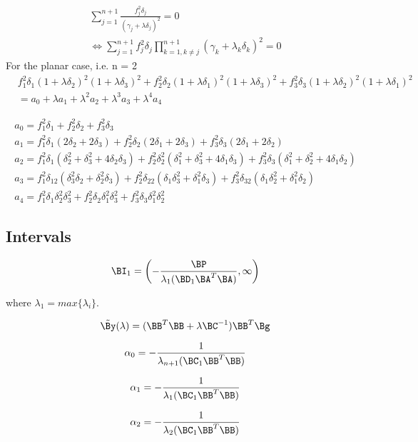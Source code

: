 \begin{eqnarray}
\sum^{n+1}_{j=1} \frac{f^2_j\delta_j}{\left(\gamma_j+\lambda\delta_j\right)^2} = 0 \\
\nonumber
\Leftrightarrow \sum^{n+1}_{j=1} f^2_j\delta_j \prod^{n+1}_{k=1,k\neq j}\left(\gamma_k + \lambda_k\delta_k\right)^2 = 0 
\end{eqnarray}
For the planar case, i.e. n = 2
\begin{equation}
\nonumber
\begin{aligned}
& f^2_1\delta_1(1 + \lambda\delta_2)^2(1 + \lambda\delta_3)^2 + f^2_2\delta_2(1 + \lambda\delta_1)^2(1 + \lambda\delta_3)^2 + f^2_3\delta_3(1 + \lambda\delta_2)^2(1 + \lambda\delta_1)^2 \\ 
& = a_0 + \lambda a_1 + \lambda^2 a_2 + \lambda^3 a_3 + \lambda^4 a_4
\end{aligned}
\end{equation}

\begin{eqnarray}
\nonumber
a_0 = f^2_1\delta_1 + f^2_2\delta_2 + f^2_3\delta_3 \\
\nonumber
a_1 = f^2_1\delta_1(2\delta_2 + 2\delta_3) + f^2_2\delta_2(2\delta_1 + 2\delta_3) + f^2_3\delta_3(2\delta_1 + 2\delta_2) \\
\nonumber
a_2 = f^2_1\delta_1(\delta^2_2 + \delta^2_3 + 4\delta_2\delta_3) + f^2_2\delta^2_2(\delta^2_1 + \delta^2_3 + 4\delta_1\delta_3) + f^2_3\delta_3(\delta^2_1 + \delta^2_2 + 4\delta_1\delta_2) \\
\nonumber
a_3 = f^2_1\delta_12(\delta^2_3\delta_2 + \delta^2_2\delta_3) + f^2_2\delta_22(\delta_1\delta^2_3 + \delta^2_1\delta_3) + f^2_3\delta_32(\delta_1\delta^2_2 + \delta^2_1\delta_2) \\
\nonumber
a_4 = f^2_1\delta_1\delta^2_2\delta^2_3 + f^2_2\delta_2\delta^2_1\delta^2_3 + f^2_3\delta_3\delta^2_1\delta^2_2
\end{eqnarray}

\subsection{Intervals}

\begin{equation}
\BI_1 = \left(-\frac{\BP}{\lambda_1(\BD_1\BA^T\BA)}, \infty\right)
\end{equation}

where $\lambda_1 = max\{\lambda_i\}$.

\begin{equation}
\tilde{\By}(\lambda) = (\BB^T\BB + \lambda\BC^{-1})\BB^T\Bg
\end{equation}

\begin{equation}
\alpha_0 = -\frac{1}{\lambda_{n+1}(\BC_1\BB^T\BB)}
\end{equation}

\begin{equation}
\alpha_1 = -\frac{1}{\lambda_1(\BC_1\BB^T\BB)}
\end{equation}

\begin{equation}
\alpha_2 = -\frac{1}{\lambda_2(\BC_1\BB^T\BB)}
\end{equation}
